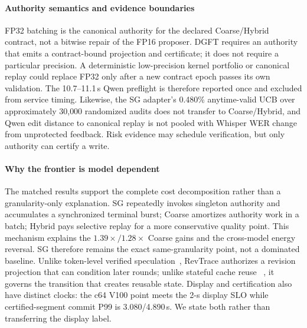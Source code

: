 
\paragraph{Authority semantics and evidence boundaries}
FP32 batching is the canonical authority for the declared Coarse/Hybrid
contract, not a bitwise repair of the FP16 proposer. DGFT requires an authority
that emits a contract-bound projection and certificate; it does not require a
particular precision. A deterministic low-precision kernel portfolio or
canonical replay could replace FP32 only after a new contract epoch passes its
own validation. The 10.7--11.1\,s Qwen preflight is therefore reported once and
excluded from service timing. Likewise, the SG adapter's 0.480\% anytime-valid
UCB over approximately 30{,}000 randomized audits does not transfer to
Coarse/Hybrid, and Qwen edit distance to canonical
replay is not pooled with Whisper WER change from unprotected feedback. Risk
evidence may schedule verification, but only authority can certify a write.

\paragraph{Why the frontier is model dependent}
The matched results support the complete cost decomposition rather than a
granularity-only explanation. SG repeatedly invokes singleton authority and
accumulates a synchronized terminal burst; Coarse amortizes authority work in a
batch; Hybrid pays selective replay for a more conservative quality point.
This mechanism explains the $1.39\times/1.28\times$ Coarse gains and the
cross-model energy reversal. SG therefore remains the exact
same-granularity point, not a dominated baseline. Unlike token-level verified
speculation~\cite{zhang2026llm42}, RevTrace authorizes a revision projection
that can condition later rounds; unlike stateful cache reuse
~\cite{yu2025pensieve,gao2024cachedattention}, it governs the transition that
creates reusable state. Display and certification also have distinct clocks:
the c64 V100 point meets the 2-s display SLO while certified-segment commit P99
is 3.080/4.890\,s. We state both rather than transferring the display label.

